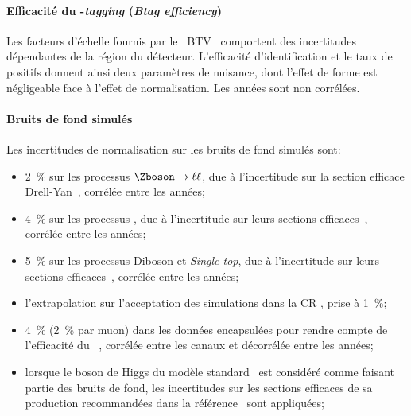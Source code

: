 \paragraph{Efficacité du \quarkb-\emph{tagging} (\emph{Btag efficiency})}
Les facteurs d'échelle fournis par le \POG\ BTV~\cite{BTV} comportent des incertitudes dépendantes de la région du détecteur.
L'efficacité d'identification et le taux de positifs donnent ainsi deux paramètres de nuisance, dont l'effet de forme est négligeable face à l'effet de normalisation.
Les années sont non corrélées.
\paragraph{Bruits de fond simulés}
Les incertitudes de normalisation sur les bruits de fond simulés sont:
\begin{itemize}
\item \SI{2}{\%} sur les processus $\Zboson\to\ell\ell$, due à l'incertitude sur la section efficace Drell-Yan~\cite{CMSxsec}, corrélée entre les années;
\item \SI{4}{\%} sur les processus \Wjets, due à l'incertitude sur leurs sections efficaces~\cite{CMSxsec}, corrélée entre les années;
\item \SI{5}{\%} sur les processus Diboson et \emph{Single top}, due à l'incertitude sur leurs sections efficaces~\cite{CMSxsec}, corrélée entre les années;
\item l'extrapolation sur l'acceptation des simulations dans la CR \ttbar, prise à \SI{1}{\%};
\item \SI{4}{\%} (\SI{2}{\%} par muon) dans les données encapsulées pour rendre compte de l'efficacité du \HLTpath\ \HLTDoubleMu, corrélée entre les canaux et décorrélée entre les années;
\item lorsque le boson de Higgs du modèle standard \higgs\ est considéré comme faisant partie des bruits de fond, les incertitudes sur les sections efficaces de sa production recommandées dans la référence~\cite{Higgs_xsec_book_4} sont appliquées;
\end{itemize}
